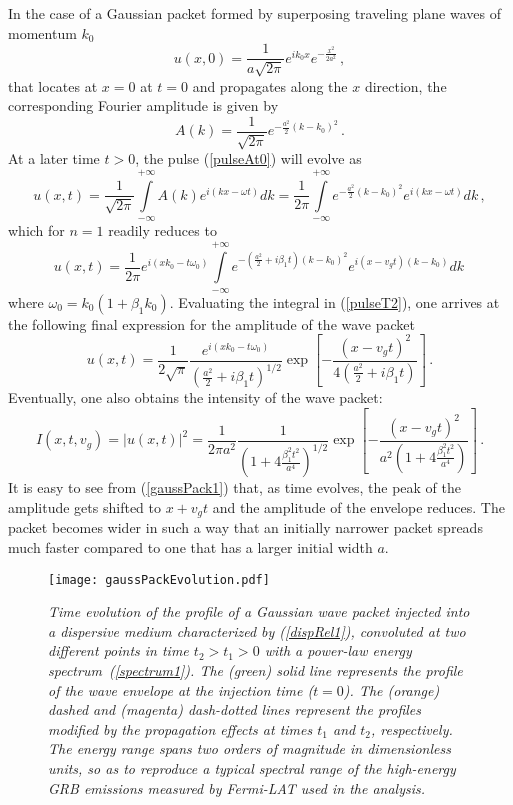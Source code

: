 \documentclass[12pt]{article}
\newcommand{\beq}{\begin{equation}}
\newcommand{\eeq}{\end{equation}}
\newcommand{\intinf}{\int\limits_{-\infty}^{+\infty}}
\begin{document}
In the case of a Gaussian packet formed by superposing traveling plane waves of momentum $k_0$
\beq
u(x,0) = \frac{1}{a\sqrt{2\pi}} e^{i k_0 x} e^{-\frac{x^2}{2a^2}} \, ,
\label{gaussPackk0}
\eeq
that locates at $x=0$ at $t=0$ and propagates along the $x$ direction, the corresponding
Fourier amplitude is given by
\beq
A(k)=\frac{1}{\sqrt{2\pi}}e^{-\frac{a^2}{2}(k-k_0)^2} \, .
\label{pulseAt0}
\eeq
At a later time $t > 0$, the pulse (\ref{pulseAt0}) will evolve as
\beq
u(x,t)=\frac{1}{\sqrt{2\pi}}\intinf A(k)e^{i(kx-\omega t)}dk=\frac{1}{2\pi}\intinf
e^{-\frac{a^2}{2}(k-k_0)^2}e^{i(kx-\omega t)}dk\, ,
\label{pulseT1}
\eeq
which for $n=1$ readily reduces to
\beq
u(x,t)=\frac{1}{2\pi}e^{i(xk_0-t\omega_0)}\intinf
e^{-\left(\frac{a^2}{2}+i\beta_1 t\right)(k-k_0)^2}e^{i(x-v_gt)(k-k_0)}dk \,
\label{pulseT2}
\eeq
where $\omega_0=k_0(1+\beta_1k_0)$.
Evaluating the integral in (\ref{pulseT2}), one arrives at the following final expression for the amplitude of the wave packet
\beq
u(x,t)=\frac{1}{2\sqrt{\pi}}\frac{e^{i(xk_0-t\omega_0)}}{\left(\frac{a^2}{2}+i\beta_1 t\right)^{1/2}}
\exp\left[-\frac{(x-v_gt)^2}{4\left(\frac{a^2}{2}+i\beta_1 t\right)}\right] \, .
\label{pulseT3}
\eeq
Eventually, one also obtains the intensity of the wave packet:
\beq
I(x,t,v_g)=|u(x,t)|^2= \frac{1}{2\pi a^2}\frac{1}{\left(1+4\frac{\beta_1^2t^2}{a^4}\right)^{1/2}}
\exp\left[-\frac{(x-v_gt)^2}{a^2\left(1+4\frac{\beta_1^2t^2}{a^4}\right)}\right] \, .
\label{gaussPack1}
\eeq
It is easy to see from (\ref{gaussPack1}) that, as time evolves, the peak of the amplitude gets shifted to $x+v_gt$
and the amplitude of the envelope reduces. The packet becomes wider in
such a way that an initially narrower packet spreads much faster compared to one that has a larger initial width $a$.

\begin{figure}
\centering
\texttt{[image: gaussPackEvolution.pdf]}
\vspace{-0.4cm}
\caption{\it Time evolution of the profile of a Gaussian wave packet injected
into a dispersive medium characterized by (\ref{dispRel1}), convoluted at two different
points in time $t_2>t_1>0$ with a power-law energy spectrum~(\ref{spectrum1}).
The (green) solid line represents the profile
of the wave envelope at the injection time ($t=0$). The (orange) dashed and (magenta) dash-dotted lines represent
the profiles modified by the propagation effects at times $t_1$ and  $t_2$, respectively.
The energy range spans two orders of magnitude in dimensionless units, so as to reproduce a typical spectral range
of the high-energy GRB emissions measured by {\it Fermi}-LAT used in the analysis.}
\label{fig:packet}
\end{figure}
\end{document}
